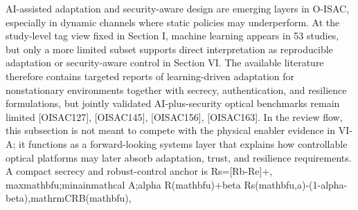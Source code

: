 \markdownRendererInterblockSeparator
{}AI-assisted adaptation and security-aware design are emerging layers in O-ISAC, especially in dynamic channels where static policies may underperform. At the study-level tag view fixed in Section I, machine learning appears in 53 studies, but only a more limited subset supports direct interpretation as reproducible adaptation or security-aware control in Section VI. The available literature therefore contains targeted reports of learning-driven adaptation for nonstationary environments together with secrecy, authentication, and resilience formulations, but jointly validated AI-plus-security optical benchmarks remain limited [O\markdownRendererUnderscore{}ISAC\markdownRendererUnderscore{}127], [O\markdownRendererUnderscore{}ISAC\markdownRendererUnderscore{}145], [O\markdownRendererUnderscore{}ISAC\markdownRendererUnderscore{}156], [O\markdownRendererUnderscore{}ISAC\markdownRendererUnderscore{}163]. In the review flow, this subsection is not meant to compete with the physical enabler evidence in VI-A; it functions as a forward-looking systems layer that explains how controllable optical platforms may later absorb adaptation, trust, and resilience requirements.\markdownRendererParagraphSeparator
{}A compact secrecy and robust-control anchor is\markdownRendererParagraphSeparator
{}\markdownRendererDollarSign{}\markdownRendererDollarSign{}\markdownRendererSoftLineBreak
{}R\markdownRendererUnderscore{}s=[R\markdownRendererUnderscore{}b-R\markdownRendererUnderscore{}e]\markdownRendererCircumflex{}+,\markdownRendererSoftLineBreak
{}\markdownRendererDollarSign{}\markdownRendererDollarSign{}\markdownRendererSoftLineBreak
{}\markdownRendererDollarSign{}\markdownRendererDollarSign{}\markdownRendererSoftLineBreak
{}\markdownRendererBackslash{}max\markdownRendererUnderscore{}\markdownRendererLeftBrace{}\markdownRendererBackslash{}mathbf\markdownRendererLeftBrace{}u\markdownRendererRightBrace{}\markdownRendererRightBrace{};\markdownRendererBackslash{}min\markdownRendererUnderscore{}\markdownRendererLeftBrace{}a\markdownRendererBackslash{}in\markdownRendererBackslash{}mathcal A\markdownRendererRightBrace{};\markdownRendererBackslash{}alpha R(\markdownRendererBackslash{}mathbf\markdownRendererLeftBrace{}u\markdownRendererRightBrace{})+\markdownRendererBackslash{}beta R\markdownRendererUnderscore{}s(\markdownRendererBackslash{}mathbf\markdownRendererLeftBrace{}u\markdownRendererRightBrace{},a)-(1-\markdownRendererBackslash{}alpha-\markdownRendererBackslash{}beta),\markdownRendererBackslash{}mathrm\markdownRendererLeftBrace{}CRB\markdownRendererRightBrace{}(\markdownRendererBackslash{}mathbf\markdownRendererLeftBrace{}u\markdownRendererRightBrace{}),\markdownRendererSoftLineBreak
